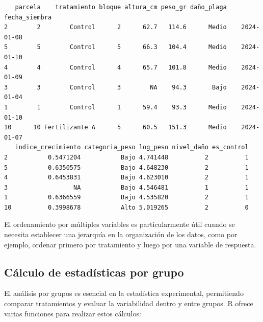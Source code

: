 \documentclass[
  spanish,
  a4paper,
  DIV=11,
  numbers=noendperiod,
  onepage,
  openany]{scrreprt}
\newenvironment{Shaded}{\begin{snugshade}}{\end{snugshade}}
\newcommand{\AttributeTok}[1]{\textcolor[rgb]{0.40,0.45,0.13}{#1}}
\newcommand{\CommentTok}[1]{\textcolor[rgb]{0.37,0.37,0.37}{#1}}
\newcommand{\ConstantTok}[1]{\textcolor[rgb]{0.56,0.35,0.01}{#1}}
\newcommand{\FunctionTok}[1]{\textcolor[rgb]{0.28,0.35,0.67}{#1}}
\newcommand{\NormalTok}[1]{\textcolor[rgb]{0.00,0.23,0.31}{#1}}
\newcommand{\OtherTok}[1]{\textcolor[rgb]{0.00,0.23,0.31}{#1}}
\newcommand{\SpecialCharTok}[1]{\textcolor[rgb]{0.37,0.37,0.37}{#1}}
\begin{document}
\begin{verbatim}
   parcela    tratamiento bloque altura_cm peso_gr daño_plaga fecha_siembra
2        2        Control      2      62.7   114.6      Medio    2024-01-08
5        5        Control      5      66.3   104.4      Medio    2024-01-10
4        4        Control      4      65.7   101.8      Medio    2024-01-09
3        3        Control      3        NA    94.3       Bajo    2024-01-04
1        1        Control      1      59.4    93.3      Medio    2024-01-10
10      10 Fertilizante A      5      60.5   151.3      Medio    2024-01-07
   indice_crecimiento categoria_peso log_peso nivel_daño es_control
2           0.5471204           Bajo 4.741448          2          1
5           0.6350575           Bajo 4.648230          2          1
4           0.6453831           Bajo 4.623010          2          1
3                  NA           Bajo 4.546481          1          1
1           0.6366559           Bajo 4.535820          2          1
10          0.3998678           Alto 5.019265          2          0
\end{verbatim}

El ordenamiento por múltiples variables es particularmente útil cuando
se necesita establecer una jerarquía en la organización de los datos,
como por ejemplo, ordenar primero por tratamiento y luego por una
variable de respuesta.

\subsection{Cálculo de estadísticas por
grupo}\label{cuxe1lculo-de-estaduxedsticas-por-grupo}

El análisis por grupos es esencial en la estadística experimental,
permitiendo comparar tratamientos y evaluar la variabilidad dentro y
entre grupos. R ofrece varias funciones para realizar estos cálculos:

\begin{Shaded}
\end{Shaded}
\end{document}
